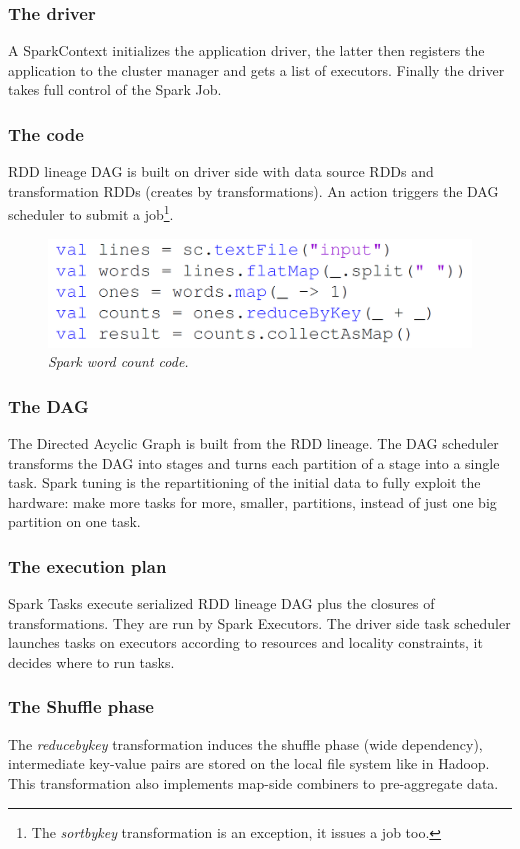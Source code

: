 	\subsubsection*{The driver}
		\par
		A SparkContext initializes the application driver, the latter then registers the application to the cluster manager and gets a list of executors. Finally the driver takes full control of the Spark Job.
	\subsubsection{The code}
		\par 
		RDD lineage DAG is built on driver side with data source RDDs and transformation RDDs (creates by transformations). An action triggers the DAG scheduler to submit a job\footnote{The \textit{sortbykey} transformation is an exception, it issues a job too.}.
		\begin{figure}[h!]
			\centering
			\includegraphics[width=\linewidth]{images/sparkwc.png}
			\caption{\textit{Spark word count code.}}
		\end{figure}
	\subsubsection{The DAG}
		\par
		The Directed Acyclic Graph is built from the RDD lineage. The DAG scheduler transforms the DAG into stages and turns each partition of a stage into a single task.
		\newline
		Spark tuning is the repartitioning of the initial data to fully exploit the hardware: make more tasks for more, smaller, partitions, instead of just one big partition on one task.
	\subsubsection{The execution plan}
		\par
		Spark Tasks execute serialized RDD lineage DAG plus the closures of transformations. They are run by Spark Executors.
		\newline
		The driver side task scheduler launches tasks on executors according to resources and locality constraints, it decides where to run tasks.
	\subsubsection{The Shuffle phase}
		\par
		The \textit{reducebykey} transformation induces the shuffle phase (wide dependency), intermediate key-value pairs are stored on the local file system like in Hadoop.
		\newline
		This transformation also implements map-side combiners to pre-aggregate data.